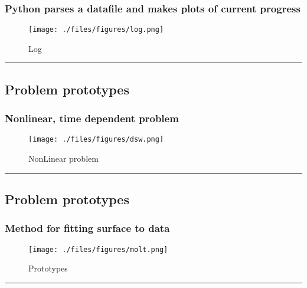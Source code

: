 \documentclass{article}
\begin{document}
\subsubsection{Python parses a datafile and makes plots of current
progress}\label{python-parses-a-datafile-and-makes-plots-of-current-progress}

\begin{figure}[htbp]
\centering
\texttt{[image: ./files/figures/log.png]}
\caption{Log}
\end{figure}

    \begin{center}\rule{3in}{0.4pt}\end{center}

\subsection{Problem prototypes}\label{problem-prototypes}

\subsubsection{Nonlinear, time dependent
problem}\label{nonlinear-time-dependent-problem}

\begin{figure}[htbp]
\centering
\texttt{[image: ./files/figures/dsw.png]}
\caption{NonLinear problem}
\end{figure}

    \begin{center}\rule{3in}{0.4pt}\end{center}

\subsection{Problem prototypes}\label{problem-prototypes}

\subsubsection{Method for fitting surface to
data}\label{method-for-fitting-surface-to-data}

\begin{figure}[htbp]
\centering
\texttt{[image: ./files/figures/molt.png]}
\caption{Prototypes}
\end{figure}

    \begin{center}\rule{3in}{0.4pt}\end{center}
\end{document}
